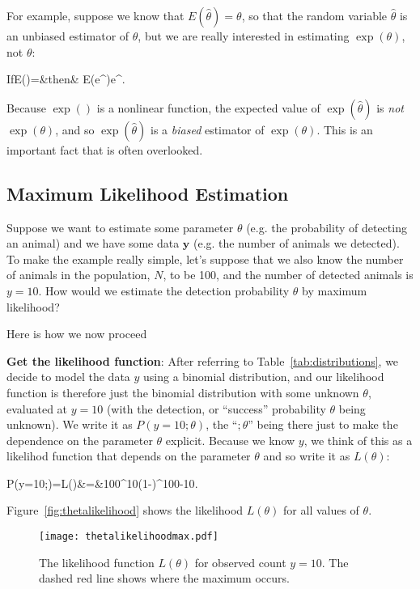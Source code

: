 For example, suppose we know that $E(\hat{\theta})=\theta$, so that the random variable $\hat{\theta}$ is an unbiased estimator of $\theta$, but we are really interested in estimating $\exp(\theta)$, not $\theta$:

\be
\mbox{If}\;\;E\left(\hat{\theta}\right)=\theta&\mbox{then}&
E\left(e^{\hat{\theta}}\right)\neq e^{\theta}.
\ee

Because $\exp()$ is a nonlinear function, the expected value of $\exp(\hat{\theta})$ is \textit{not} $\exp(\theta)$, and so $\exp(\hat{\theta})$ is a \textit{biased} estimator of $\exp(\theta)$. This is an important fact that is often overlooked.

\subsection{Maximum Likelihood Estimation}

Suppose we want to estimate some parameter $\theta$ (e.g. the probability of detecting an animal) and we have some data $\bm{y}$ (e.g. the number of animals we detected). To make the example really simple, let's suppose that we also know the number of animals in the population, $N$, to be 100, and the number of detected animals is $y=10$. How would we estimate the detection probability $\theta$ by maximum likelihood?

Here is how we now proceed

\ben

\item \textbf{Get the likelihood function}: After referring to Table~\ref{tab:distributions}, we decide to model the data $y$ using a binomial distribution, and our likelihood function is therefore just the binomial distribution with some unknown $\theta$, evaluated at $y=10$ (with the detection, or ``success'' probability $\theta$ being unknown). We write it as $P(y=10;\theta)$, the ``$;\theta$'' being there just to make the dependence on the parameter $\theta$ explicit.  Because we know $y$, we think of this as a likelihod function that depends on the parameter $\theta$ and so write it as $L(\theta)$:

\be
P(y=10;\theta)\;=\;L(\theta)&=&{100}\theta^{10}(1-\theta)^{100-10}.
\label{eq:binlik}
\ee

Figure~\ref{fig:thetalikelihood} shows the likelihood $L(\theta)$ for all values of $\theta$. 

\begin{figure}[ht!]
\caption{\small The likelihood function $L(\theta)$ for observed count $y=10$. The dashed red line shows where the maximum occurs.}
\centering
\texttt{[image: thetalikelihoodmax.pdf]}
\label{fig:thetalikelihoodmax}
\end{figure}

